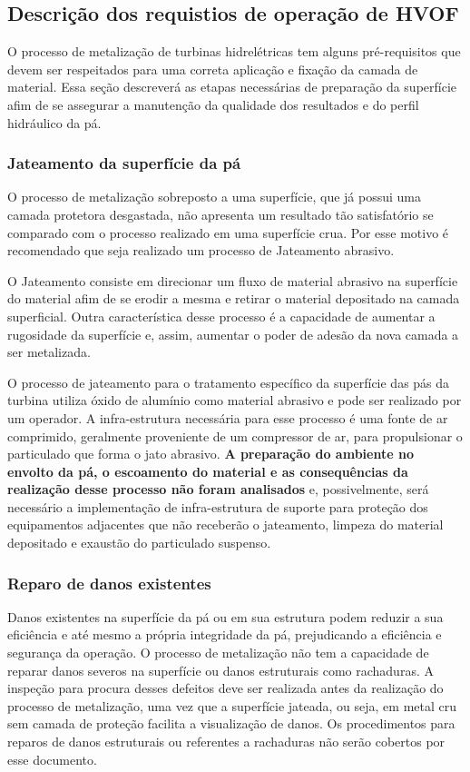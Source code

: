 \subsection{Descrição dos requistios de operação de HVOF}

O processo de metalização de turbinas hidrelétricas tem alguns pré-requisitos
que devem ser respeitados para uma correta aplicação e fixação da camada de
material. Essa seção descreverá as etapas necessárias de preparação da
superfície afim de se assegurar a manutenção da qualidade dos resultados e do
perfil hidráulico da pá. 

\subsubsection{Jateamento da superfície da pá}

O processo de metalização sobreposto a uma superfície, que já possui uma camada
protetora desgastada, não apresenta um resultado tão satisfatório se comparado
com o processo realizado em uma superfície crua. Por esse motivo é recomendado
que seja realizado um processo de Jateamento abrasivo. 

O Jateamento consiste em direcionar um fluxo de material abrasivo na superfície
do material afim de se erodir a mesma e retirar o material depositado na camada
superficial. Outra característica desse processo é a capacidade de aumentar a
rugosidade da superfície e, assim, aumentar o poder de adesão da nova camada a
ser metalizada.

O processo de jateamento para o tratamento específico da superfície das pás da
turbina utiliza óxido de alumínio como material abrasivo e pode ser realizado
por um operador. A infra-estrutura necessária para esse processo é uma fonte de
ar comprimido, geralmente proveniente de um compressor de ar, para propulsionar
o particulado que forma o jato abrasivo. \textbf{A preparação do ambiente no envolto da pá, 
o escoamento do material e
as consequências da realização desse processo não foram analisados} e,
possivelmente, será necessário a implementação de infra-estrutura de suporte
para proteção dos equipamentos adjacentes que não receberão o jateamento,
limpeza do material depositado e exaustão do particulado suspenso.

\subsubsection{Reparo de danos existentes}

Danos existentes na superfície da pá ou em sua estrutura podem reduzir a sua
eficiência e até mesmo a própria integridade da pá, prejudicando a eficiência e
segurança da operação. O processo de metalização não tem a capacidade de reparar
danos severos na superfície ou danos estruturais como rachaduras. A inspeção
para procura desses defeitos deve ser realizada antes da realização do processo
de metalização, uma vez que a superfície jateada, ou seja, em metal cru sem
camada de proteção facilita a visualização de danos. Os procedimentos para
reparos de danos estruturais ou referentes a rachaduras não serão cobertos por
esse documento.

